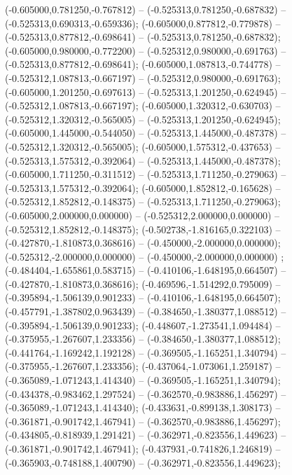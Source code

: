  (-0.605000,0.781250,-0.767812) -- (-0.525313,0.781250,-0.687832) -- (-0.525313,0.690313,-0.659336);
 (-0.605000,0.877812,-0.779878) -- (-0.525313,0.877812,-0.698641) -- (-0.525313,0.781250,-0.687832);
 (-0.605000,0.980000,-0.772200) -- (-0.525312,0.980000,-0.691763) -- (-0.525313,0.877812,-0.698641);
 (-0.605000,1.087813,-0.744778) -- (-0.525312,1.087813,-0.667197) -- (-0.525312,0.980000,-0.691763);
 (-0.605000,1.201250,-0.697613) -- (-0.525313,1.201250,-0.624945) -- (-0.525312,1.087813,-0.667197);
 (-0.605000,1.320312,-0.630703) -- (-0.525312,1.320312,-0.565005) -- (-0.525313,1.201250,-0.624945);
 (-0.605000,1.445000,-0.544050) -- (-0.525313,1.445000,-0.487378) -- (-0.525312,1.320312,-0.565005);
 (-0.605000,1.575312,-0.437653) -- (-0.525313,1.575312,-0.392064) -- (-0.525313,1.445000,-0.487378);
 (-0.605000,1.711250,-0.311512) -- (-0.525313,1.711250,-0.279063) -- (-0.525313,1.575312,-0.392064);
 (-0.605000,1.852812,-0.165628) -- (-0.525312,1.852812,-0.148375) -- (-0.525313,1.711250,-0.279063);
 (-0.605000,2.000000,0.000000) -- (-0.525312,2.000000,0.000000) -- (-0.525312,1.852812,-0.148375);
 (-0.502738,-1.816165,0.322103) -- (-0.427870,-1.810873,0.368616) -- (-0.450000,-2.000000,0.000000);
 (-0.525312,-2.000000,0.000000) -- (-0.450000,-2.000000,0.000000) ;
 (-0.484404,-1.655861,0.583715) -- (-0.410106,-1.648195,0.664507) -- (-0.427870,-1.810873,0.368616);
 (-0.469596,-1.514292,0.795009) -- (-0.395894,-1.506139,0.901233) -- (-0.410106,-1.648195,0.664507);
 (-0.457791,-1.387802,0.963439) -- (-0.384650,-1.380377,1.088512) -- (-0.395894,-1.506139,0.901233);
 (-0.448607,-1.273541,1.094484) -- (-0.375955,-1.267607,1.233356) -- (-0.384650,-1.380377,1.088512);
 (-0.441764,-1.169242,1.192128) -- (-0.369505,-1.165251,1.340794) -- (-0.375955,-1.267607,1.233356);
 (-0.437064,-1.073061,1.259187) -- (-0.365089,-1.071243,1.414340) -- (-0.369505,-1.165251,1.340794);
 (-0.434378,-0.983462,1.297524) -- (-0.362570,-0.983886,1.456297) -- (-0.365089,-1.071243,1.414340);
 (-0.433631,-0.899138,1.308173) -- (-0.361871,-0.901742,1.467941) -- (-0.362570,-0.983886,1.456297);
 (-0.434805,-0.818939,1.291421) -- (-0.362971,-0.823556,1.449623) -- (-0.361871,-0.901742,1.467941);
 (-0.437931,-0.741826,1.246819) -- (-0.365903,-0.748188,1.400790) -- (-0.362971,-0.823556,1.449623);
